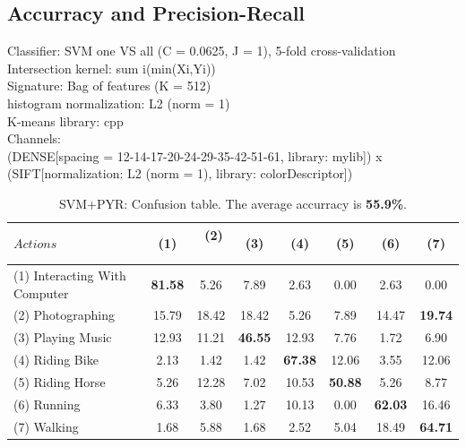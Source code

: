\documentclass[10pt,a4paper]{llncs}
\begin{document}
\subsection{Accurracy and Precision-Recall}

Classifier: SVM one VS all (C = 0.0625, J = 1), 5-fold cross-validation\\
Intersection kernel: sum i(min(Xi,Yi))\\
Signature: Bag of features (K = 512)\\
histogram normalization: L2 (norm = 1)\\
K-means library: cpp\\
Channels:\\
(DENSE[spacing = 12-14-17-20-24-29-35-42-51-61, library: mylib]) x (SIFT[normalization: L2 (norm = 1), library: colorDescriptor])\\

\begin{table}[H]
\centering
\caption{SVM+PYR: Confusion table. The average accurracy is \textbf{55.9\%}.}
\label{table:SVM_PYR:Accuracy}
\begin{tabular}{|l|c|c|c|c|c|c|c|}
\hline
$Actions $ & $~~$(1)$~~$ & $~~$(2)$~~$ & $~~$(3)$~~$ & $~~$(4)$~~$ & $~~$(5)$~~$ & $~~$(6)$~~$ & $~~$(7)$~~$\\ \hline
(1) Interacting With Computer & \cellcolor{lightgray}\textbf{81.58} & 5.26 & 7.89 & 2.63 & 0.00 & 2.63 & 0.00  \\ \hline
(2) Photographing             & 15.79 & 18.42 & 18.42 & 5.26 & 7.89 & 14.47 & \cellcolor{lightgray}\textbf{19.74}  \\ \hline
(3) Playing Music             & 12.93 & 11.21 & \cellcolor{lightgray}\textbf{46.55} & 12.93 & 7.76 & 1.72 & 6.90 \\ \hline
(4) Riding Bike               & 2.13 & 1.42 & 1.42 & \cellcolor{lightgray}\textbf{67.38} & 12.06 & 3.55 & 12.06 \\ \hline
(5) Riding Horse              & 5.26 & 12.28 & 7.02 & 10.53 & \cellcolor{lightgray}\textbf{50.88} & 5.26 & 8.77  \\ \hline
(6) Running                   & 6.33 & 3.80 & 1.27 & 10.13 & 0.00 & \cellcolor{lightgray}\textbf{62.03} & 16.46 \\ \hline
(7) Walking                   & 1.68 & 5.88 & 1.68 & 2.52 & 5.04 & 18.49 & \cellcolor{lightgray}\textbf{64.71} \\ \hline
\end{tabular}
\end{table}
\end{document}
